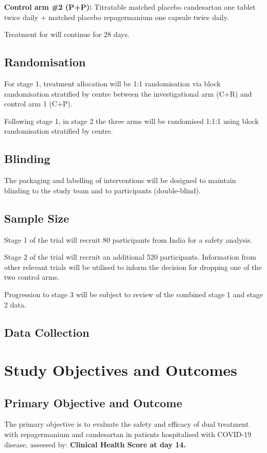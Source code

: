 \documentclass[11pt,parskip=half-]{scrartcl}
\begin{document}
\textbf{Control arm \#2 (P+P):}  Titratable matched placebo candesartan
one tablet twice daily + matched placebo repagermanium one capsule twice daily.

Treatment for will continue for 28 days.

\subsection{Randomisation}
For stage 1, treatment allocation will be 1:1 randomisation via block randomisation stratified by centre between the investigational arm (C+R) and control arm 1 (C+P).

Following stage 1, in stage 2 the three arms will be randomised 1:1:1 using block randomisation stratified by centre.

\subsection{Blinding}
The packaging and labelling of interventions will be designed to maintain blinding to the study team and to participants (double-blind).

\subsection{Sample Size}
Stage 1 of the trial will recruit 80 participants from India for a safety analysis.

Stage 2 of the trial will recruit an additional 520 participants. Information from other relevant trials will be utilised to inform the decision for dropping one of the two control arms.

Progression to stage 3 will be subject to review of the combined stage 1 and stage 2 data.

\subsection{Data Collection}

\clearpage

\section{Study Objectives and Outcomes}

\subsection{Primary Objective and Outcome}
The primary objective is to evaluate the safety and efficacy of dual treatment with repagermanium and candesartan in patients hospitalised with COVID-19 disease, assessed by: \textbf{Clinical Health Score at day 14.}
\end{document}

